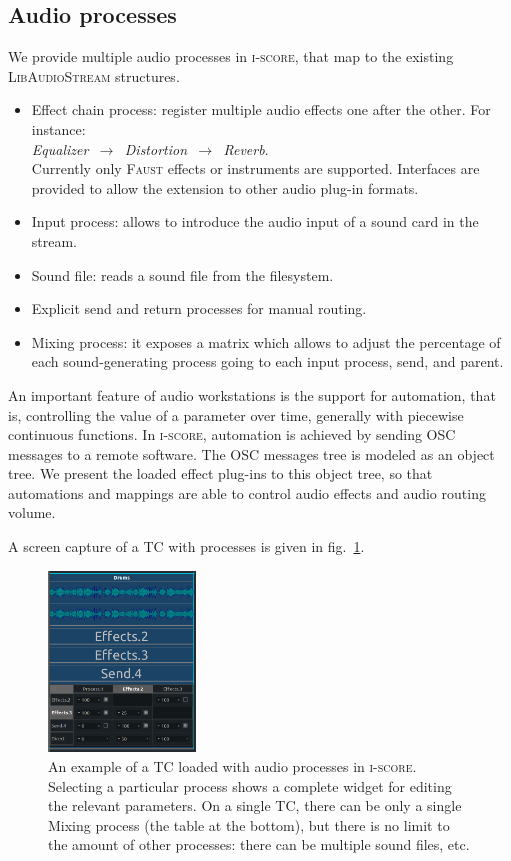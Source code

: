 \documentclass{article}
\newcommand*{\LibAudioStream}{\textsc{LibAudioStream}\xspace}
\newcommand*{\iscore}{\textsc{i-score}\xspace}
\newcommand*{\faust}{\textsc{Faust}\xspace}
\newcommand*{\timeconstraint}{\ac{TC}\xspace}
\begin{document}
\subsection{Audio processes}
\label{sec.processes}
We provide multiple audio processes in \iscore, that map 
to the existing \LibAudioStream structures.

\begin{itemize}
	\item Effect chain process: register multiple audio effects one after the other. 
	For instance:~\\ \emph{Equalizer $\,\to\,$ Distortion $\,\to\,$ Reverb}. ~\\
	Currently only \faust effects or instruments are supported. 
    Interfaces are provided to allow the extension to other audio plug-in formats.
	\item Input process: allows to introduce the audio input of a sound card in the stream.
	\item Sound file: reads a sound file from the filesystem.
	\item Explicit send and return processes for manual routing.
	\item Mixing process: it exposes a matrix which allows to adjust the percentage of each sound-generating process going to each input process, send, and parent.
\end{itemize}

An important feature of audio workstations is the support for automation, that is, 
controlling the value of a parameter over time, generally with piecewise continuous functions.
In \iscore, automation is achieved by sending OSC messages to a remote software.
The OSC messages tree is modeled as an object tree.
We present the loaded effect plug-ins to this object tree, so that automations 
and mappings are able to control audio effects and audio routing volume.

A screen capture of a \timeconstraint with processes is given in fig.~\ref{fig.iscoreconstraint}.
\begin{figure}
	\centering
	\includegraphics[width=0.35\textwidth]{figures/mix.png}
	\caption{An example of a \timeconstraint loaded with audio processes in \iscore. 
		Selecting a particular process shows a complete widget for editing the relevant parameters. On a single \timeconstraint, there can be only a single Mixing process (the table at the bottom), but there is no limit to the amount of other processes: there can be multiple sound files, etc.}
	\label{fig.iscoreconstraint}
\end{figure}
\end{document}
